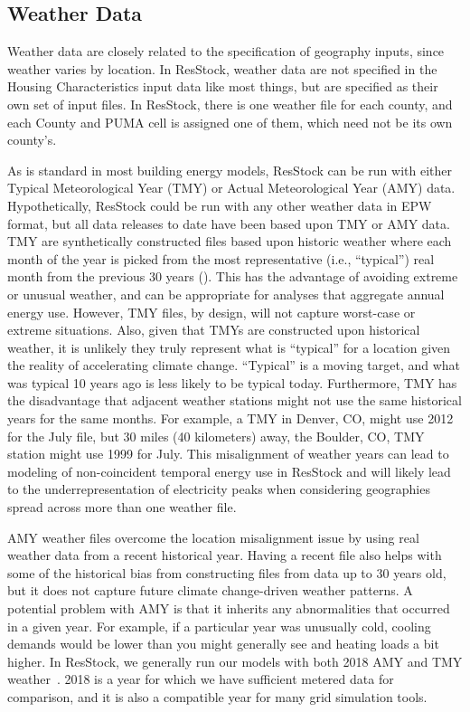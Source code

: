 \subsection{Weather Data}
Weather data are closely related to the specification of geography inputs, since weather varies by location. In ResStock, weather data are not specified in the Housing Characteristics input data like most things, but are specified as their own set of input files. In ResStock, there is one weather file for each county, and each County and PUMA cell is assigned one of them, which need not be its own county's.

As is standard in most building energy models, ResStock can be run with either Typical Meteorological Year (TMY) or Actual Meteorological Year (AMY) data. Hypothetically, ResStock could be run with any other weather data in EPW format, but all data releases to date have been based upon TMY or AMY data. TMY are synthetically constructed files based upon historic weather where each month of the year is picked from the most representative (i.e., ``typical'') real month from the previous 30 years (\cite{Wilcox2008}). This has the advantage of avoiding extreme or unusual weather, and can be appropriate for analyses that aggregate annual energy use. However, TMY files, by design, will not capture worst-case or extreme situations. Also, given that TMYs are constructed upon historical weather, it is unlikely they truly represent what is ``typical'' for a location given the reality of accelerating climate change. ``Typical'' is a moving target, and what was typical 10 years ago is less likely to be typical today. Furthermore, TMY has the disadvantage that adjacent weather stations might not use the same historical years for the same months. For example, a TMY in Denver, CO, might use 2012 for the July file, but 30 miles (40 kilometers) away, the Boulder, CO, TMY station might use 1999 for July. This misalignment of weather years can lead to modeling of non-coincident temporal energy use in ResStock and will likely lead to the underrepresentation of electricity peaks when considering geographies spread across more than one weather file.

AMY weather files overcome the location misalignment issue by using real weather data from a recent historical year. Having a recent file also helps with some of the historical bias from constructing files from data up to 30 years old, but it does not capture future climate change-driven weather patterns. A potential problem with AMY is that it inherits any abnormalities that occurred in a given year. For example, if a particular year was unusually cold, cooling demands would be lower than you might generally see and heating loads a bit higher.  In ResStock, we generally run our models with both 2018 AMY and TMY weather~\citep{Bianchi2021}. 2018 is a year for which we have sufficient metered data for comparison, and it is also a compatible year for many grid simulation tools.

